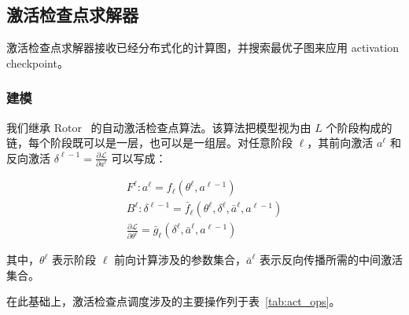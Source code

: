 \documentclass[10pt,letterpaper,twocolumn]{article}
\begin{document}
\subsection{激活检查点求解器}

激活检查点求解器接收已经分布式化的计算图，并搜索最优子图来应用 activation checkpoint。

\subsubsection{建模}

我们继承 Rotor~\cite{herrmann2019optimal} 的自动激活检查点算法。该算法把模型视为由 $L$ 个阶段构成的链，每个阶段既可以是一层，也可以是一组层。对任意阶段 $\ell$，其前向激活 $a^{\ell}$ 和反向激活 $\delta^{\ell-1} = \frac{\partial \mathcal{L}}{\partial a^{\ell}}$ 可以写成：

\begin{equation}
\begin{gathered}
F^{\ell}: a^{\ell}=f_{\ell}\left(\theta^{\ell}, a^{\ell-1}\right) \\
B^{\ell}: \delta^{\ell-1}=\bar{f}_{\ell}\left(\theta^{\ell}, \delta^{\ell}, \bar{a}^{\ell}, a^{\ell-1}\right) \\
\frac{\partial \mathcal{L}}{\partial \theta^{\ell}}=\bar{g}_{\ell}\left(\delta^{\ell}, \bar{a}^{\ell}, a^{\ell-1}\right)
\end{gathered}
\end{equation}

其中，$\theta^{\ell}$ 表示阶段 $\ell$ 前向计算涉及的参数集合，$\bar{a}^{\ell}$ 表示反向传播所需的中间激活集合。

在此基础上，激活检查点调度涉及的主要操作列于表~\ref{tab:act_ops}。
\end{document}
